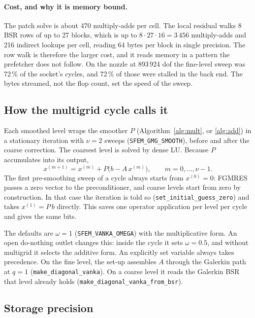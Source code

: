 \documentclass[11pt,a4paper]{article}
\newcommand{\code}[1]{\texttt{\small #1}}
\begin{document}
\paragraph{Cost, and why it is memory bound.} The patch solve is about 470 multiply-adds per
cell. The local residual walks 8 BSR rows of up to 27 blocks, which is up to
$8\cdot27\cdot16 = 3\,456$ multiply-adds and 216 indirect lookups per cell, reading 64 bytes
per block in single precision. The row walk is therefore the larger cost, and it reads memory
in a pattern the prefetcher does not follow. On the nozzle at 893\,924 dof the fine-level
sweep was 72\,\% of the socket's cycles, and 72\,\% of those were stalled in the back end.
The bytes streamed, not the flop count, set the speed of the sweep.

\subsection{How the multigrid cycle calls it}

Each smoothed level wraps the smoother $P$ (Algorithm~\ref{alg:mult}, or \ref{alg:add}) in a
stationary iteration with $\nu = 2$ sweeps (\code{SFEM\_GMG\_SMOOTH}), before and after the
coarse correction. The coarsest level is solved by dense LU. Because $P$ accumulates into its
output,
\begin{equation}
x^{(m+1)} = x^{(m)} + P\big(b - A\,x^{(m)}\big), \qquad m = 0,\dots,\nu-1 .
\end{equation}
The first pre-smoothing sweep of a cycle always starts from $x^{(0)} = 0$: FGMRES passes a
zero vector to the preconditioner, and coarse levels start from zero by construction. In that
case the iteration is told so (\code{set\_initial\_guess\_zero}) and takes $x^{(1)} = P\,b$
directly. This saves one operator application per level per cycle and gives the same bits.

The defaults are $\omega = 1$ (\code{SFEM\_VANKA\_OMEGA}) with the multiplicative form. An open
do-nothing outlet changes this: inside the cycle it sets $\omega = 0.5$, and without multigrid
it selects the additive form. An explicitly set variable always takes precedence. On the
fine level, the set-up assembles $A$ through the Galerkin path at $q = 1$
(\code{make\_diagonal\_vanka}). On a coarse level it reads the Galerkin BSR that level already
holds (\code{make\_diagonal\_vanka\_from\_bsr}).

\subsection{Storage precision}
\label{sec:precision}
\end{document}
